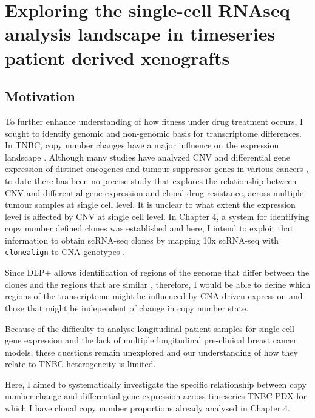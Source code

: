 
{\chapter{Exploring the single-cell RNAseq analysis landscape in timeseries patient derived xenografts} }



 \label{ch:Chapter5}


 \section{Motivation}


To further enhance understanding of how fitness under drug treatment occurs, I sought to identify genomic and non-genomic basis for transcriptome differences. 
In TNBC, copy number changes have a major influence on the expression landscape \cite{wang2016integrative}.
Although many studies have analyzed CNV and differential gene expression of distinct oncogenes and tumour suppressor genes in various cancers \cite{kuzyk2015mycn, budczies2016pan, kwak2015fibroblast}, to date there has been no precise study that explores the relationship between CNV and differential gene expression and clonal drug resistance,  across multiple tumour samples at single cell level. It is unclear to what extent the expression level is affected by CNV at single cell level.
In Chapter 4, a system for identifying copy number defined clones was established and here, I intend to exploit that information to obtain scRNA-seq clones by mapping 10x scRNA-seq with \texttt{clonealign} to CNA genotypes \cite{campbell2019clonealign}.

Since \ac{DLP+} allows identification of regions of the genome that differ between the clones and the regions that are similar \cite{laks2019clonal}, therefore, I would be able to define which regions of the transcriptome might be influenced by CNA driven expression and those that might be independent of change in copy number state.

Because of the difficulty to analyse longitudinal patient samples for single cell gene expression and the lack of multiple longitudinal pre-clinical breast cancer models, these questions remain unexplored and our understanding of how they relate to TNBC heterogeneity is limited.

Here, I aimed to systematically investigate the specific relationship between copy number change and differential gene expression across timeseries TNBC PDX for which I have clonal copy number proportions already analysed in Chapter 4. 

